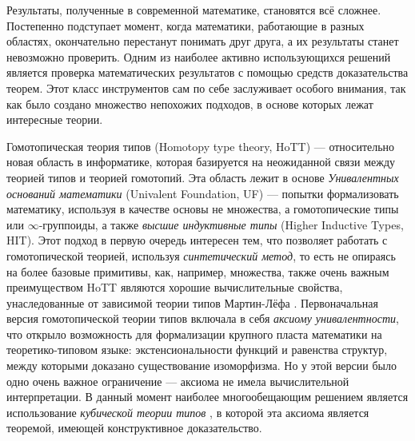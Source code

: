







\Introduction

Результаты, полученные в современной математике, становятся всё сложнее. Постепенно подступает момент, когда математики, работающие в разных областях, окончательно перестанут понимать друг друга, а их результаты станет невозможно проверить. Одним из наиболее активно использующихся решений является проверка математических результатов с помощью средств доказательства теорем. Этот класс инструментов сам по себе заслуживает особого внимания, так как было создано множество непохожих подходов, в основе которых лежат интересные теории.

Гомотопическая теория типов (Homotopy type theory, HoTT) \autocite{hottbook} --- относительно новая область в информатике, которая базируется на неожиданной связи между теорией типов и теорией гомотопий. Эта область лежит в основе \textit{Унивалентных оснований математики} (Univalent Foundation, UF) \autocite{UFP2010} --- попытки формализовать математику, используя в качестве основы не множества, а гомотопические типы или $\infty$-группоиды, а также \textit{высшие индуктивные типы} (Higher Inductive Types, HIT). Этот подход в первую очередь интересен тем, что позволяет работать с гомотопической теорией, используя \textit{синтетический метод}, то есть не опираясь на более базовые примитивы, как, например, множества, также очень важным преимуществом HoTT являются хорошие вычислительные свойства, унаследованные от зависимой теории типов Мартин-Лёфа \autocite{MLTT}. Первоначальная версия гомотопической теории типов включала в себя \textit{аксиому унивалентности}, что открыло возможность для формализации крупного пласта математики на теоретико-типовом языке: экстенсиональности функций и равенства структур, между которыми доказано существование изоморфизма. Но у этой версии было одно очень важное ограничение --- аксиома не имела вычислительной интерпретации. В данный момент наиболее многообещающим решением является использование \textit{кубической теории типов} \autocite{CohenCHM16}, в которой эта аксиома является теоремой, имеющей конструктивное доказательство.

